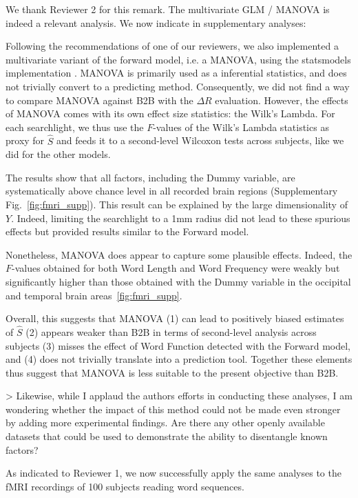 We thank Reviewer 2 for this remark. The multivariate GLM / MANOVA is indeed
a relevant analysis. We now indicate in supplementary analyses:

Following the recommendations of one of our reviewers, we also implemented a
multivariate variant of the forward model, i.e. a MANOVA, using the statsmodels
implementation \citep{seabold2010statsmodels}. MANOVA is primarily used as a
inferential statistics, and does not trivially convert to a predicting method.
Consequently, we did not find a way to compare MANOVA against B2B with the
$\Delta R$ evaluation. However, the effects of MANOVA comes with its own effect
size statistics: the Wilk's Lambda. For each searchlight, we thus use the $F$-values of the
Wilk's Lambda statistics as proxy for $\hat S$ and feeds it to a second-level
Wilcoxon tests across subjects, like we did for the other models.

The results show that all factors, including the Dummy variable, are
systematically above chance level in all recorded brain regions (Supplementary Fig.~\ref{fig:fmri_supp}). This result
can be explained by the large dimensionality of $Y$. Indeed, limiting the
searchlight to a 1mm radius did not lead to these spurious effects but provided
results similar to the Forward model.

Nonetheless, MANOVA does appear to capture some plausible effects. Indeed, the
$F$-values obtained for both Word Length and Word Frequency were weakly but
significantly higher than those obtained with the Dummy variable in the
occipital and temporal brain areas~\ref{fig:fmri_supp}.

Overall, this suggests that MANOVA (1) can lead to positively biased estimates of
$\hat S$ (2) appears weaker than B2B in terms of second-level analysis across
subjects (3) misses the effect of Word Function detected with the Forward model,
and (4) does not trivially translate into a prediction tool. Together these
elements thus suggest that MANOVA is less suitable to the present objective than
B2B.


> Likewise, while I applaud the authors efforts in conducting these analyses,
    I am wondering whether the impact of this method could not be made even
    stronger by adding more experimental findings. Are there any other openly
    available datasets that could be used to demonstrate the ability to
    disentangle known factors?

As indicated to Reviewer 1, we now successfully apply the same analyses to the fMRI
recordings of 100 subjects reading word sequences.

